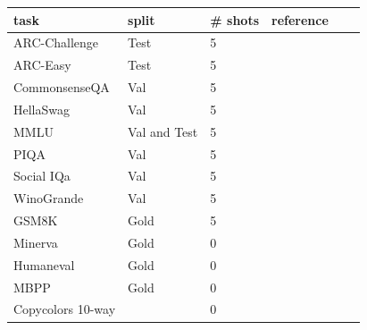 \begin{table}[t]
  \centering

    \begin{small}
    \begin{tabular}{llllll}
    \toprule
    \bf{task} & \bf{split} & \bf{\# shots} & \bf{reference}\\
    \midrule
    ARC-Challenge & Test & 5 & \citep{clark2018think} \\
    ARC-Easy & Test & 5 & \citep{clark2018think}\\
    CommonsenseQA & Val & 5 & \citep{talmor-etal-2019-commonsenseqa} \\
    HellaSwag & Val & 5 & \citep{zellers-etal-2019-hellaswag}\\
    MMLU & Val and Test & 5 & \citep{hendryckstest2021}\\
    PIQA & Val & 5 & \citep{Bisk_Zellers_Le_bras_Gao_Choi_2020}\\
    Social IQa & Val & 5 & \citep{sap-etal-2019-social}\\
    WinoGrande & Val & 5 & \citep{Sakaguchi_Le_Bras_Bhagavatula_Choi_2020}\\
    GSM8K & Gold & 5 & \citep{cobbe2021training}\\
    Minerva & Gold & 0 & \citep{lewkowycz2022solving}\\
    Humaneval & Gold & 0 & \citep{chen2021evaluating}\\
    MBPP & Gold & 0 & \citep{austin2021program}\\
    Copycolors 10-way & & 0 & \citep{Wiegreffe2024AnswerAA}\\
    \bottomrule
    \end{tabular}
    \end{small}
\end{table}
